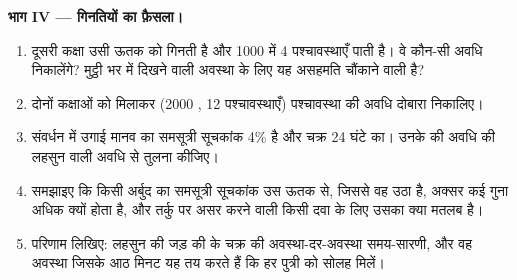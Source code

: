 \begin{problem}
\medskip
\noindent\textbf{भाग IV --- गिनतियों का फ़ैसला।}
\begin{enumerate}[resume]
  \item दूसरी कक्षा उसी ऊतक को गिनती है और 1000  में 4
        पश्चावस्थाएँ पाती है। वे कौन-सी अवधि निकालेंगे? मुट्ठी भर
         में दिखने वाली अवस्था के लिए यह असहमति चौंकाने वाली है?
  \item दोनों कक्षाओं को मिलाकर (2000 , 12 पश्चावस्थाएँ)
        पश्चावस्था की अवधि दोबारा निकालिए।
  \item संवर्धन में उगाई मानव  का समसूत्री सूचकांक 4\% है और चक्र
        24 घंटे का। उनके  की अवधि की लहसुन वाली अवधि से
        तुलना कीजिए।
  \item समझाइए कि किसी अर्बुद का समसूत्री सूचकांक उस ऊतक से, जिससे वह
        उठा है, अक्सर कई गुना अधिक क्यों होता है, और तर्कु पर असर करने
        वाली किसी दवा के लिए उसका क्या मतलब है।
  \item परिणाम लिखिए: लहसुन की जड़ की  के चक्र की अवस्था-दर-अवस्था
        समय-सारणी, और वह अवस्था जिसके आठ मिनट यह तय करते हैं कि हर पुत्री
        को सोलह  मिलें।
\end{enumerate}
\end{problem}
